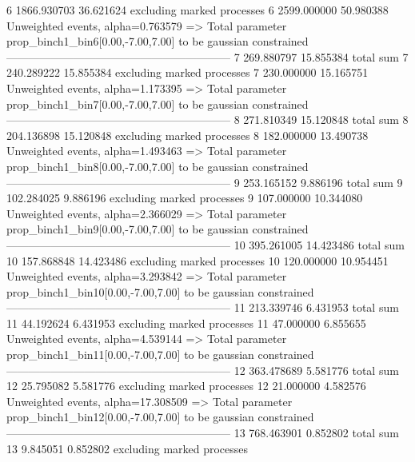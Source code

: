 6          1866.930703     36.621624       excluding marked processes    
6          2599.000000     50.980388       Unweighted events, alpha=0.763579
  => Total parameter prop_binch1_bin6[0.00,-7.00,7.00] to be gaussian constrained
------------------------------------------------------------
7          269.880797      15.855384       total sum                     
7          240.289222      15.855384       excluding marked processes    
7          230.000000      15.165751       Unweighted events, alpha=1.173395
  => Total parameter prop_binch1_bin7[0.00,-7.00,7.00] to be gaussian constrained
------------------------------------------------------------
8          271.810349      15.120848       total sum                     
8          204.136898      15.120848       excluding marked processes    
8          182.000000      13.490738       Unweighted events, alpha=1.493463
  => Total parameter prop_binch1_bin8[0.00,-7.00,7.00] to be gaussian constrained
------------------------------------------------------------
9          253.165152      9.886196        total sum                     
9          102.284025      9.886196        excluding marked processes    
9          107.000000      10.344080       Unweighted events, alpha=2.366029
  => Total parameter prop_binch1_bin9[0.00,-7.00,7.00] to be gaussian constrained
------------------------------------------------------------
10         395.261005      14.423486       total sum                     
10         157.868848      14.423486       excluding marked processes    
10         120.000000      10.954451       Unweighted events, alpha=3.293842
  => Total parameter prop_binch1_bin10[0.00,-7.00,7.00] to be gaussian constrained
------------------------------------------------------------
11         213.339746      6.431953        total sum                     
11         44.192624       6.431953        excluding marked processes    
11         47.000000       6.855655        Unweighted events, alpha=4.539144
  => Total parameter prop_binch1_bin11[0.00,-7.00,7.00] to be gaussian constrained
------------------------------------------------------------
12         363.478689      5.581776        total sum                     
12         25.795082       5.581776        excluding marked processes    
12         21.000000       4.582576        Unweighted events, alpha=17.308509
  => Total parameter prop_binch1_bin12[0.00,-7.00,7.00] to be gaussian constrained
------------------------------------------------------------
13         768.463901      0.852802        total sum                     
13         9.845051        0.852802        excluding marked processes    
